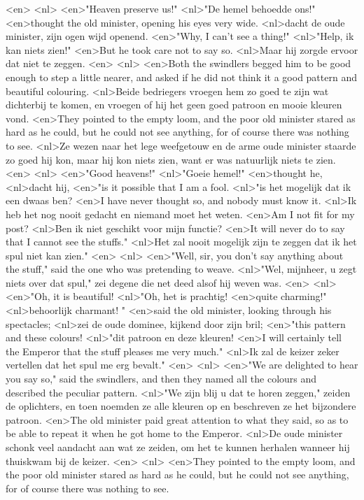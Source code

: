 <en>
<nl>
<en>"Heaven preserve us!"
<nl>"De hemel behoedde ons!"
<en>thought the old minister, opening his eyes very wide.
<nl>dacht de oude minister, zijn ogen wijd openend.
<en>"Why, I can't see a thing!"
<nl>"Help, ik kan niets zien!"
<en>But he took care not to say so.
<nl>Maar hij zorgde ervoor dat niet te zeggen.
<en>
<nl>
<en>Both the swindlers begged him to be good enough to step a little nearer, and asked if he did not think it a good pattern and beautiful colouring.
<nl>Beide bedriegers vroegen hem zo  goed te zijn wat dichterbij te komen, en vroegen of hij het geen goed patroon en mooie kleuren vond.
<en>They pointed to the empty loom, and the poor old minister stared as hard as he could, but he could not see anything, for of course there was nothing to see.
<nl>Ze wezen naar het lege weefgetouw en de arme oude minister staarde zo goed hij kon, maar hij kon niets zien, want er was natuurlijk niets te zien.
<en>
<nl>
<en>"Good heavens!"
<nl>"Goeie hemel!"
<en>thought he,
<nl>dacht hij,
<en>"is it possible that I am a fool.
<nl>"is het mogelijk dat ik een dwaas ben?
<en>I have never thought so, and nobody must know it.
<nl>Ik heb het nog nooit gedacht en niemand moet het weten.
<en>Am I not fit for my post?
<nl>Ben ik niet geschikt voor mijn functie?
<en>It will never do to say that I cannot see the stuffs."
<nl>Het zal nooit mogelijk zijn te zeggen dat ik het spul niet kan zien."
<en>
<nl>
<en>"Well, sir, you don't say anything about the stuff," said the one who was pretending to weave.
<nl>"Wel, mijnheer, u zegt niets over dat spul," zei degene die net deed alsof hij weven was.
<en>
<nl>
<en>"Oh, it is beautiful!
<nl>"Oh, het is prachtig!
<en>quite charming!"
<nl>behoorlijk charmant! "
<en>said the old minister, looking through his spectacles;
<nl>zei de oude dominee, kijkend door zijn bril;
<en>"this pattern and these colours!
<nl>"dit patroon en deze kleuren!
<en>I will certainly tell the Emperor that the stuff pleases me very much."
<nl>Ik zal de keizer zeker vertellen dat het spul me erg bevalt."
<en>
<nl>
<en>"We are delighted to hear you say so," said the swindlers, and then they named all the colours and described the peculiar pattern.
<nl>"We zijn blij u dat te horen zeggen," zeiden de oplichters, en toen noemden ze alle kleuren op en beschreven ze het bijzondere patroon.
<en>The old minister paid great attention to what they said, so as to be able to repeat it when he got home to the Emperor.
<nl>De oude minister schonk veel aandacht aan wat ze zeiden, om het te kunnen herhalen wanneer hij thuiskwam bij de keizer.
<en>
<nl>
<en>They pointed to the empty loom, and the poor old minister stared as hard as he could, but he could not see anything, for of course there was nothing to see.
